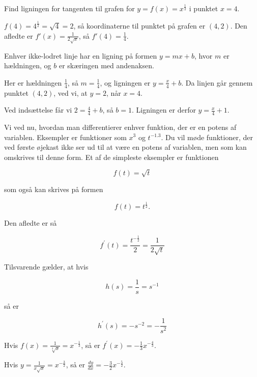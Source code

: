 \begin{example}

Find ligningen for tangenten til grafen for $y=f(x)=x^{\frac{1}{2}}$ i punktet $x=4$.



\begin{solution}

$f(4)=4^{\frac{1}{2}}=\sqrt{4}=2$, så koordinaterne til punktet på grafen er $(4,2)$. Den afledte er $f'(x)=\frac{1}{2\sqrt{x}}$, så $f'(4)=\frac{1}{4}$.

Enhver ikke-lodret linje har en ligning på formen $y=m x+b$, hvor $m$ er hældningen, og $b$ er skæringen med andenaksen.

Her er hældningen $\frac{1}{4}$, så $m=\frac{1}{4}$, og ligningen er $y=\frac{x}{4}+b$. Da linjen går gennem punktet $(4,2)$, ved vi, at $y=2$, når $x=4$.

Ved indsættelse får vi $2=\frac{4}{4}+b$, så $b=1$. Ligningen er derfor $y=\frac{x}{4}+1$. \end{solution}

\end{example}

Vi ved nu, hvordan man differentierer enhver funktion, der er en potens af variablen. Eksempler er funktioner som $x^{3}$ og $t^{-1.3}$. Du vil møde funktioner, der ved første øjekast ikke ser ud til at være en potens af variablen, men som kan omskrives til denne form. Et af de simpleste eksempler er funktionen

\[
    f(t)=\sqrt{t}
\]

som også kan skrives på formen

\[
f(t)=t^{\frac{1}{2}} .
\]

Den afledte er så

\[
f^{\prime}(t)=\frac{t^{-\frac{1}{2}}}{2}=\frac{1}{2 \sqrt{t}}
\]

Tilsvarende gælder, at hvis

\[
h(s)=\frac{1}{s}=s^{-1}
\]

så er

\[
h^{\prime}(s)=-s^{-2}=-\frac{1}{s^{2}}
\]

\begin{example}

Hvis $f(x)=\frac{1}{\sqrt[3]{x}}=x^{-\frac{1}{3}}$, så er $f^{\prime}(x)=-\frac{1}{3} x^{-\frac{4}{3}}$.
\end{example}

\begin{example}

Hvis $y=\frac{1}{x \sqrt{x}}=x^{-\frac{3}{2}}$, så er $\frac{d y}{d x}=-\frac{3}{2} x^{-\frac{5}{2}}$.
\end{example}


